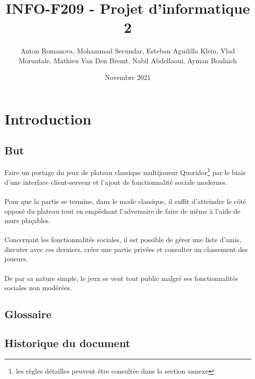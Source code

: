 \documentclass[french, utf8]{article}
\title{INFO-F209 - Projet d'informatique 2 }
\author{Anton Romanova, Mohammad Secundar, Esteban Aguililla Klein, Vlad Moruntale, Mathieu Van Den Bremt, Nabil Abdellaoui, Ayman Boulaich}
\date{Novembre 2021}
\begin{document}
\maketitle
\tableofcontents
\newpage


\section{Introduction}
\subsection{But}
Faire un portage du jeux de plateau classique multijoueur Quoridor\footnote{les règles détailles peuvent être consultée dans la section annexe} par le biais d'une interface client-serveur et l'ajout de fonctionnalité sociale modernes.
\\ \\
Pour que la partie se termine, dans le mode classique, il suffit d'atteindre le côté opposé du plateau tout en empêchant l'adversaire de faire de même à l'aide de murs plaçables.    %
\\ \\
Concernant les fonctionnalités sociales, il est possible de gérer une liste d'amis, discuter avec ces derniers, créer une partie privées et consulter un classement des joueurs.
\\ \\
De par sa nature simple, le jeux se veut tout public malgré ses fonctionnalités sociales non modérées.  %

\subsection{Glossaire}

\subsection{Historique du document}
\end{document}

